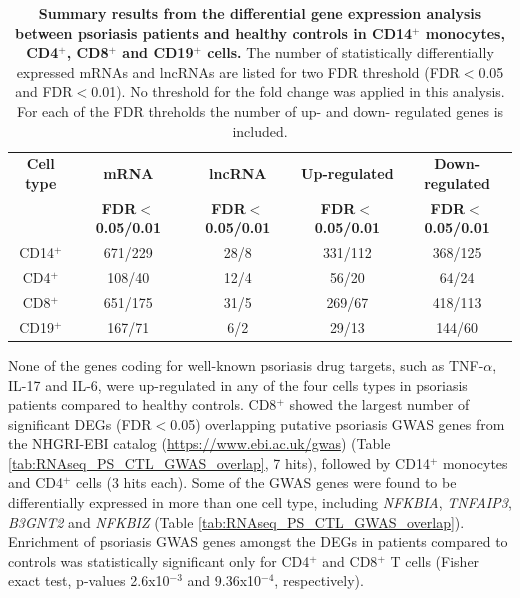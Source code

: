 \begin{table}[htbp]
\centering
\begin{tabular}{@{} c c c c c}
\toprule
\textbf{Cell type}   & \textbf{mRNA}            & \textbf{lncRNA}           & \textbf{Up-regulated}        & \textbf{Down-regulated}\\
                     & \textbf{FDR$<$0.05/0.01} & \textbf{FDR$<$0.05/0.01}  & \textbf{FDR$<$0.05/0.01}    & \textbf{FDR$<$0.05/0.01}\\
	
										
\midrule
\midrule
CD14$^+$             & 671/229                  & 28/8                    & 331/112                       &368/125\\               
CD4$^+$              & 108/40                   & 12/4                    & 56/20                         &64/24 \\
CD8$^+$              & 651/175                  & 31/5                    & 269/67                        &418/113 \\
CD19$^+$             & 167/71                   & 6/2                     & 29/13                         &144/60\\
\bottomrule 
\end{tabular}
\medskip %
\caption[Summary results from the differential gene expression analysis between psoriasis patients and healthy controls in CD14$^+$ monocytes, CD4$^+$, CD8$^+$ and CD19$^+$ cells.]{\textbf{Summary results from the differential gene expression analysis between psoriasis patients and healthy controls in CD14$^+$ monocytes, CD4$^+$, CD8$^+$ and CD19$^+$ cells.} The number of statistically differentially expressed mRNAs and lncRNAs are listed for two FDR threshold (FDR$<$0.05 and FDR$<$0.01). No threshold for the fold change was applied in this analysis. For each of the FDR threholds the number of up- and down- regulated genes is included.}
\label{tab:RNAseq_PS_CTL_differential_analysis_results}
\end{table}
\bigskip %


None of the genes coding for well-known psoriasis drug targets, such as TNF-$\alpha$, IL-17 and IL-6, were up-regulated in any of the four cells types in psoriasis patients compared to healthy controls. CD8$^+$ showed the largest number of significant DEGs (FDR$<$0.05) overlapping putative psoriasis GWAS genes from the NHGRI-EBI catalog (\url{https://www.ebi.ac.uk/gwas}) (Table \ref{tab:RNAseq_PS_CTL_GWAS_overlap}, 7 hits), followed by CD14$^+$ monocytes and CD4$^+$ cells (3 hits each). Some of the GWAS genes were found to be differentially expressed in more than one cell type, including \textit{NFKBIA}, \textit{TNFAIP3}, \textit{B3GNT2} and \textit{NFKBIZ} (Table \ref{tab:RNAseq_PS_CTL_GWAS_overlap}). Enrichment of psoriasis GWAS genes amongst the DEGs in patients compared to controls was statistically significant only for CD4$^+$ and CD8$^+$ T cells (Fisher exact test, p-values 2.6x10$^{-3}$ and 9.36x10$^{-4}$, respectively).

